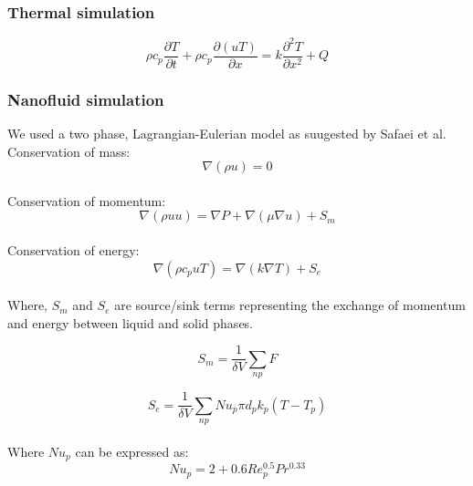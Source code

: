 \documentclass[../main.tex]{subfiles}
\begin{document}
\subsubsection{Thermal simulation}
\begin{equation}
    \rho c_p \frac{\partial T}{\partial t} + \rho c_p \frac{\partial (u T)}{\partial x}  = k \frac{\partial^2 T}{\partial x^2} + Q
\end{equation}

\subsubsection{Nanofluid simulation}

We used a two phase, Lagrangian-Eulerian model as suugested by Safaei et al.
\\
Conservation of mass:
\begin{equation}
    \nabla (\rho u) = 0
\end{equation}
\\
Conservation of momentum:
\begin{equation}
    \nabla (\rho u u) = \nabla P + \nabla (\mu \nabla u) + S_m
\end{equation}
\\
Conservation of energy:
\begin{equation}
    \nabla(\rho c_p u T) = \nabla (k \nabla T) + S_e
\end{equation}
\\
Where, $S_m$ and $S_e$ are source/sink terms representing the exchange of momentum and energy
between liquid and solid phases.

\begin{equation}
    S_m = \frac{1}{\delta V} \sum_{np}F
\end{equation}

\begin{equation}
    S_e = \frac{1}{\delta V} \sum_{np}Nu_p \pi d_p k_p (T - T_p)
\end{equation}
\\
Where $Nu_p$ can be expressed as:
\\
\begin{equation}
    Nu_p = 2 + 0.6Re_p^{0.5} Pr^{0.33}
\end{equation}
\end{document}
